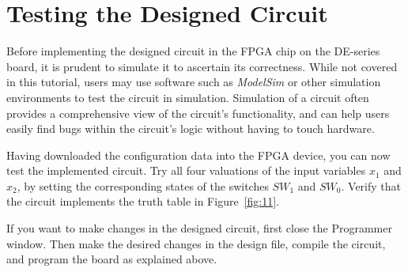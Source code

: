 \section{Testing the Designed Circuit}

Before implementing the designed circuit in the FPGA chip on the DE-series board, it is
prudent to simulate it to ascertain its correctness. While not covered in this tutorial,
users may use software such as {\it ModelSim} or other simulation environments to test the 
circuit in simulation. Simulation of a circuit often provides a comprehensive view of the 
circuit's functionality, and can help users easily find bugs within the circuit's logic 
without having to touch hardware.

Having downloaded the configuration data into the FPGA device, you can now
test the implemented circuit.  Try all four valuations of the input variables
$x_1$ and $x_2$, by setting the corresponding states of the switches
$SW_1$ and $SW_0$. Verify that the circuit implements the truth table
in Figure~\ref{fig:11}.

If you want to make changes in the designed circuit, first close the Programmer window.
Then make the desired changes in the \typeName{} design file, compile the circuit,
and program the board as explained above.

